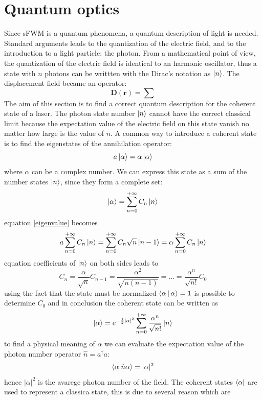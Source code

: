 \documentclass[12pt]{book}
\renewcommand{\r}{\mathbf{r}}
\begin{document}
\section{Quantum optics}
Since sFWM is a quantum phenomena, a quantum description of light is needed. Standard arguments \cite{book:cohen} leads to the quantization of the electric field, and to the introduction to a light particle: the photon. From a mathematical point of view, the quantization of the electric field is identical to an harmonic oscillator, thus a state with $n$ photons can be writtten with the Dirac's notation as $\Ket{n}$. The displacement field became an operator:
\begin{equation}
\mathbf{D}(\r) = \sum 
\end{equation}
The aim of this section is to find a correct quantum description for the coherent state of a laser. The photon state number $\Ket{n}$ cannot have the correct classical limit because the expectation value of the electric field on this state vanish no matter how large is the value of $n$. A common way to introduce a coherent state is to find the eigenstates of the annihilation operator:
\begin{equation}\label{eigenvalue}
a\ket{\alpha} = \alpha \ket{\alpha}
\end{equation}
where $\alpha$ can be a complex number. We can express this state as a sum of the number states $\ket{n}$, since they form a complete set:
\[\ket{\alpha} = \sum_{n=0}^{+\infty} C_n \ket{n}\]
equation \eqref{eigenvalue} becomes
\[a\sum_{n=0}^{+\infty} C_n \ket{n} = \sum_{n=0}^{+\infty} C_n\sqrt{n}\ket{n-1} =\alpha\sum_{n=0}^{+\infty} C_n \ket{n}\]
equation coefficients of $\ket{n}$ on both sides leads to
\[C_n = \frac{\alpha}{\sqrt{n}}C_{n-1} = \frac{\alpha^2}{\sqrt{n(n-1)}} = \dots = \frac{\alpha^n}{\sqrt{n!}}C_0\]
using the fact that the state must be normalized $\Braket{\alpha|\alpha} = 1$ is possible to determine $C_0$ and in conclusion the coherent state can be written as
\begin{equation}\label{coherentstate}
\ket{\alpha} = e^{-\frac{1}{2}|\alpha|^2}\sum_{n=0}^{+\infty} \frac{\alpha^n}{\sqrt{n!}}\ket{n}
\end{equation}
to find a physical meaning of $\alpha$ we can evaluate the expectation value of the photon number operator $\hat{n} = a^\dagger a$:
\[\braket{\alpha|\hat{n}\alpha} = |\alpha|^2 \]
hence $|\alpha|^2$ is the avarege photon number of the field. The coherent states $\bra{\alpha}$ are used to represent a classica state, this is due to several reason which are
\end{document}
